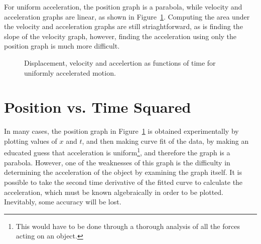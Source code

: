 \documentclass[11pt]{article}
\begin{document}
For uniform acceleration, the position graph is a parabola, while velocity and
acceleration graphs are linear, as shown in Figure~\ref{uniform-acceleration}.
Computing the area under the velocity and acceleration graphs are still
striaghtforward, as is finding the slope of the velocity graph, however,
finding the acceleration using only the position graph is much more difficult.
\begin{figure}[!ht]
  \centering
  \hspace{.15in}
  \hspace{.15in}
  \caption{Displacement, velocity and accelertion as functions of time for
    uniformly accelerated motion.}
  \label{uniform-acceleration}
\end{figure}


\section{Position vs. Time Squared}
In many cases, the position graph in Figure~\ref{uniform-acceleration} is
obtained experimentally by plotting values of $x$ and $t$, and then making
curve fit of the data, by making an educated guess that acceleration is
uniform\footnote{This would have to be done through a thorough analysis of all
  the forces acting on an object.}, and therefore the graph is a parabola.
However, one of the weaknesses of this graph is the difficulty in determining
the acceleration of the object by examining the graph itself. It is possible to
take the second time derivative of the fitted curve to calculate the
acceleration, which must be known algebraically in order to be plotted.
Inevitably, some accuracy will be lost.
\end{document}
